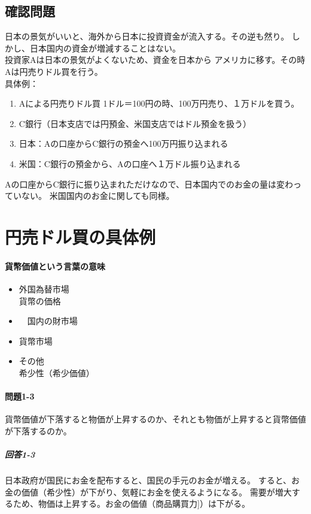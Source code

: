 \documentclass{jsarticle}
\begin{document}
\subsection{確認問題}
日本の景気がいいと、海外から日本に投資資金が流入する。その逆も然り。
しかし、日本国内の資金が増減することはない。\\
投資家Aは日本の景気がよくないため、資金を日本から
アメリカに移す。その時Aは円売りドル買を行う。\\
具体例：
\begin{enumerate}
  \item Aによる円売りドル買 1ドル＝100円の時、100万円売り、１万ドルを買う。
  \item C銀行（日本支店では円預金、米国支店ではドル預金を扱う）
  \item 日本：Aの口座からC銀行の預金へ100万円振り込まれる
  \item 米国：C銀行の預金から、Aの口座へ１万ドル振り込まれる

\end{enumerate}
Aの口座からC銀行に振り込まれただけなので、日本国内でのお金の量は変わっていない。
米国国内のお金に関しても同様。

\section{円売ドル買の具体例}


\paragraph{貨幣価値という言葉の意味}
\begin{itemize}
  \item 外国為替市場 \\
  貨幣の価格
  \item　国内の財市場
  \item 貨幣市場
  \item その他\\
  希少性（希少価値）


\end{itemize}

\paragraph{問題1-3}
貨幣価値が下落すると物価が上昇するのか、それとも物価が上昇すると貨幣価値が下落するのか。\\
\subparagraph{回答1-3}
日本政府が国民にお金を配布すると、国民の手元のお金が増える。
すると、お金の価値（希少性）が下がり、気軽にお金を使えるようになる。
需要が増大するため、物価は上昇する。お金の価値（商品購買力]）は下がる。
\end{document}

